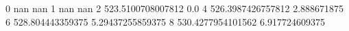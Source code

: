 0 nan nan
1 nan nan
2 523.5100708007812 0.0
4 526.3987426757812 2.888671875
6 528.804443359375 5.29437255859375
8 530.4277954101562 6.917724609375
